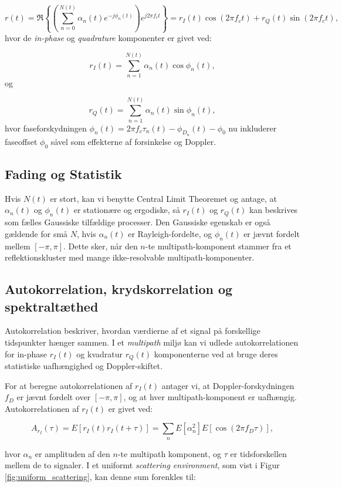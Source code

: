 \documentclass[a4paper,12pt]{book}
\begin{document}
	\[
	r(t) = \Re \left\{ \left( \sum_{n=0}^{N(t)} \alpha_n(t) e^{-j \phi_n(t)} \right) e^{j 2 \pi f_c t} \right\} = r_I(t) \cos \left( 2 \pi f_c t \right) + r_Q(t) \sin \left( 2 \pi f_c t \right),
	\]
	\noindent
	hvor de \textit{in-phase} og \textit{quadrature} komponenter er givet ved:
	
	\[
	r_I(t) = \sum_{n=1}^{N(t)} \alpha_n(t) \cos \phi_n(t),
	\]
	\noindent
	og
	
	\[
	r_Q(t) = \sum_{n=1}^{N(t)} \alpha_n(t) \sin \phi_n(t),
	\]
	\noindent
	hvor faseforskydningen \( \phi_n(t) = 2\pi f_c \tau_n(t) - \phi_{D_n}(t) - \phi_0 \) nu inkluderer faseoffset \( \phi_0 \) såvel som effekterne af forsinkelse og Doppler.
	
	\subsection{Fading og Statistik}
	Hvis \( N(t) \) er stort, kan vi benytte Central Limit Theoremet og antage, at \( \alpha_n(t) \) og \( \phi_n(t) \) er stationære og ergodiske, så \( r_I(t) \) og \( r_Q(t) \) kan beskrives som fælles Gaussiske tilfældige processer. Den Gaussiske egenskab er også gældende for små \( N \), hvis \( \alpha_n(t) \) er Rayleigh-fordelte, og \( \phi_n(t) \) er jævnt fordelt mellem \( [-\pi, \pi] \). Dette sker, når den \( n \)-te multipath-komponent stammer fra et reflektionskluster med mange ikke-resolvable multipath-komponenter.
	\clearpage

	\subsection{Autokorrelation, krydskorrelation og spektraltæthed}
	
	Autokorrelation beskriver, hvordan værdierne af et signal på forskellige tidspunkter hænger sammen. I et \textit{multipath} miljø kan vi udlede autokorrelationen for in-phase $r_I(t)$ og kvadratur $r_Q(t)$ komponenterne ved at bruge deres statistiske uafhængighed og Doppler-skiftet.
	
	For at beregne autokorrelationen af $r_I(t)$ antager vi, at Doppler-forskydningen $f_D$ er jævnt fordelt over $[-\pi, \pi]$, og at hver multipath-komponent er uafhængig. Autokorrelationen af $r_I(t)$ er givet ved:
	
	\[
	A_{r_I}(\tau) = E[r_I(t)r_I(t + \tau)] = \sum_n E[\alpha_n^2] E[\cos(2\pi f_D \tau)],
	\]
	
	hvor $\alpha_n$ er amplituden af den $n$-te multipath komponent, og $\tau$ er tidsforskellen mellem de to signaler. 
	\newline\newline
	I et uniformt \textit{scattering environment}, som vist i Figur \ref{fig:uniform_scattering}, kan denne sum forenkles til:
	
\end{document}
